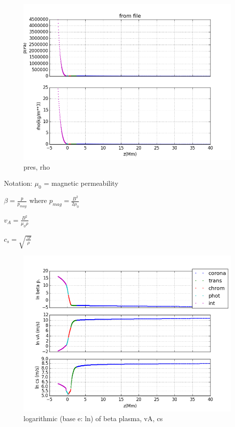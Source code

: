 \documentclass[10pt]{book}
\begin{document}
\begin{figure}[!ht]
 \centering
 \includegraphics[scale=0.5]{fromFile1.png}
 \caption{pres, rho}
\end{figure}

Notation: $\mu_0$ = magnetic permeability 

$\beta = \frac{p}{p_{mag}}$ where $p_{mag} = \frac{B^2}{2 \mu_0}$

$v_A = \frac{B ^2 }{ \mu_0 \rho} $

$c_s = \sqrt{\frac{\gamma p}{ \rho}} $

\newpage
\begin{figure}[!ht]
 \centering
 \includegraphics[scale=0.5]{fromFileLn2.png}
 \caption{logarithmic (base e: ln) of beta plasma, vA, cs}
\end{figure}
\end{document}
